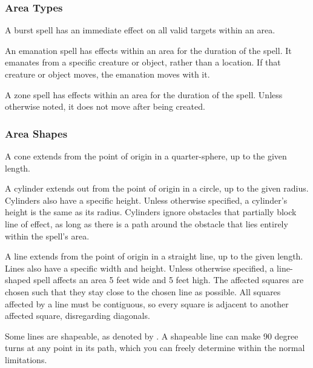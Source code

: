         \subsubsection{Area Types}\label{Area Types}

             A burst spell has an immediate effect on all valid targets within an area.

             An emanation spell has effects within an area for the duration of the spell.
            It emanates from a specific creature or object, rather than a location.
            If that creature or object moves, the emanation moves with it.

             A zone spell has effects within an area for the duration of the spell.
            Unless otherwise noted, it does not move after being created.

        \subsubsection{Area Shapes}

             A cone extends from the point of origin in a quarter-sphere, up to the given length.

             A cylinder extends out from the point of origin in a circle, up to the given radius.
            Cylinders also have a specific height.
            Unless otherwise specified, a cylinder's height is the same as its radius.
            Cylinders ignore obstacles that partially block line of effect, as long as there is a path around the obstacle that lies entirely within the spell's area.

             A line extends from the point of origin in a straight line, up to the given length.
            Lines also have a specific width and height.
            Unless otherwise specified, a line-shaped spell affects an area 5 feet wide and 5 feet high.
            The affected squares are chosen such that they stay close to the chosen line as possible.
            All squares affected by a line must be contiguous, so every square is adjacent to another affected square, disregarding diagonals.

            \label{Shapeable} Some lines are shapeable, as denoted by \shapeable.
            A shapeable line can make 90 degree turns at any point in its path, which you can freely determine within the normal limitations.

